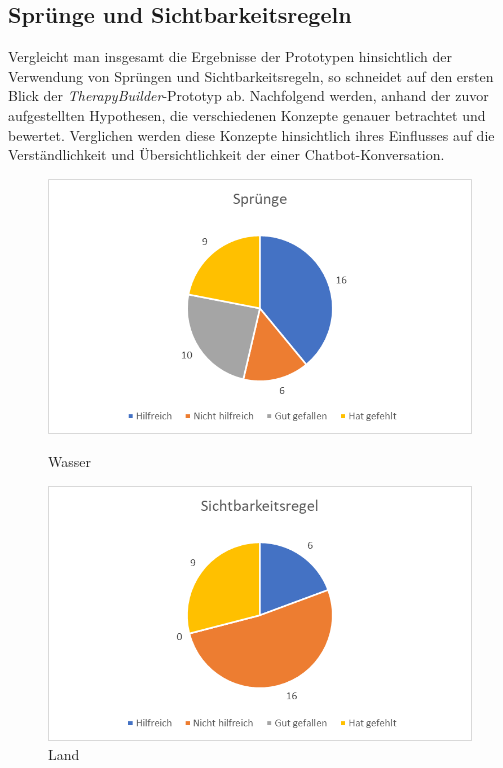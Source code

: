 \subsection{Sprünge und Sichtbarkeitsregeln}
Vergleicht man insgesamt die Ergebnisse der Prototypen hinsichtlich der Verwendung von Sprüngen und Sichtbarkeitsregeln, so schneidet auf den ersten Blick der \emph{TherapyBuilder}-Prototyp ab. Nachfolgend werden, anhand der zuvor aufgestellten Hypothesen, die verschiedenen Konzepte genauer betrachtet und bewertet. Verglichen werden diese Konzepte hinsichtlich ihres Einflusses auf die Verständlichkeit und Übersichtlichkeit der einer Chatbot-Konversation.


\begin{figure}
   \begin{minipage}[b]{.49\linewidth} %
      \includegraphics[width=\linewidth]{pictures/diagramme/aussagenspr}
      \caption{Wasser}
   \end{minipage}
   \hspace{.01\linewidth}%
   \begin{minipage}[b]{.49\linewidth} %
      \includegraphics[width=\linewidth]{pictures/diagramme/aussagensichtb}
      \caption{Land}
   \end{minipage}
\end{figure}


